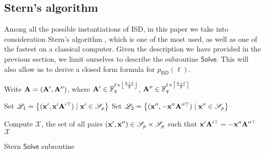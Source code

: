 \subsection{Stern's algorithm}
Among all the possible instantiations of ISD, in this paper we take into consideration Stern's algorithm \cite{stern1989method}, which is one of the most used, as well as one of the fastest on a classical computer.
Given the description we have provided in the previous section, we limit ourselves to describe the subroutine $\mathsf{Solve}$.
This will also allow us to derive a closed form formula for $p_{\mathsf{ISD}}(\ell)$.

\begin{algorithm}[h!]
    \vspace{2mm}
    \SetAlgoNoLine
    \vspace{0.5mm}
    Write $\mathbf A = (\mathbf A', \mathbf A'')$, where $\mathbf A'\in\mathbb F_q^{\ell\times\left\lfloor\frac{k+\ell}{2}\right\rfloor}$, $\mathbf A''\in\mathbb F_q^{\ell\times\left\lceil\frac{k+\ell}{2}\right\rceil}$\;
    
    \vspace{0.5em}
    Set $\mathscr L_1 = \left\{(\mathbf x', \mathbf x'\mathbf A'^\top)\mid\mathbf x'\in\mathscr S_p\right\}$\;
    Set $\mathscr L_2 = \left\{(\mathbf x'', -\mathbf x''\mathbf A''^\top)\mid\mathbf x''\in\mathscr S_p\right\}$\;
    
    \vspace{0.5em}
    Compute $\mathscr X$, the set of all pairs $(\mathbf x', \mathbf x'') \in \mathscr S_p\times \mathscr S_p$ such that $ \mathbf x'\mathbf A'^\top = -\mathbf x''\mathbf A''^\top$\;
    \Return $\mathscr X$
    \caption{Stern $\mathsf{Solve}$ subroutine}
    \label{alg:stern}
\end{algorithm}




